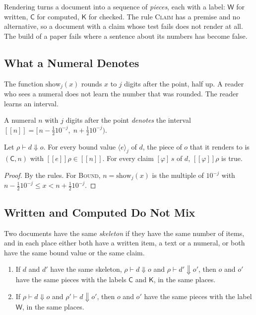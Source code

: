 \documentclass[acmsmall,nonacm,screen]{acmart}
\newcommand{\sem}[1]{[\![#1]\!]}
\newcommand{\evto}{\Downarrow}
\newcommand{\lW}{\mathsf{W}}
\newcommand{\lC}{\mathsf{C}}
\newcommand{\lK}{\mathsf{K}}
\newcommand{\bound}[2]{\langle #1 \rangle_{#2}}
\newcommand{\shw}[2]{\mathrm{show}_{#1}(#2)}
\begin{document}
Rendering turns a document into a sequence of \emph{pieces}, each with a label: $\lW$ for
written, $\lC$ for computed, $\lK$ for checked. The rule \textsc{Claim} has a premise and no
alternative, so a document with a claim whose test fails does not render at all. The build
of a paper fails where a sentence about its numbers has become false.

\subsection{What a Numeral Denotes}

The function $\shw{j}{x}$ rounds $x$ to $j$ digits after the point, half up. A reader who
sees a numeral does not learn the number that was rounded. The reader learns an interval.

\begin{definition}[Denotation]
\label{def:denotes}
A numeral $n$ with $j$ digits after the point \emph{denotes} the interval
$\sem{n} = [\,n - \frac{1}{2} 10^{-j},\; n + \frac{1}{2} 10^{-j})$.
\end{definition}

\begin{theorem}[Faithfulness]
\label{thm:faithful}
Let $\rho \vdash d \evto o$. For every bound value $\bound{e}{j}$ of $d$, the piece of $o$
that it renders to is $(\lC, n)$ with $\sem{e}\rho \in \sem{n}$. For every claim
$[\varphi]\,s$ of $d$, $\sem{\varphi}\rho$ is true.
\end{theorem}

\begin{proof}
By the rules. For \textsc{Bound}, $n = \shw{j}{x}$ is the multiple of $10^{-j}$ with
$n - \frac{1}{2} 10^{-j} \le x < n + \frac{1}{2} 10^{-j}$.
\end{proof}

\subsection{Written and Computed Do Not Mix}

Two documents have the same \emph{skeleton} if they have the same number of items, and in
each place either both have a written item, a text or a numeral, or both have the same bound
value or the same claim.

\begin{theorem}[Provenance]
\label{thm:provenance}
\begin{enumerate}
\item If $d$ and $d'$ have the same skeleton, $\rho \vdash d \evto o$ and
  $\rho \vdash d' \evto o'$, then $o$ and $o'$ have the same pieces with the labels $\lC$
  and $\lK$, in the same places.
\item If $\rho \vdash d \evto o$ and $\rho' \vdash d \evto o'$, then $o$ and $o'$ have the
  same pieces with the label $\lW$, in the same places.
\end{enumerate}
\end{theorem}
\end{document}
